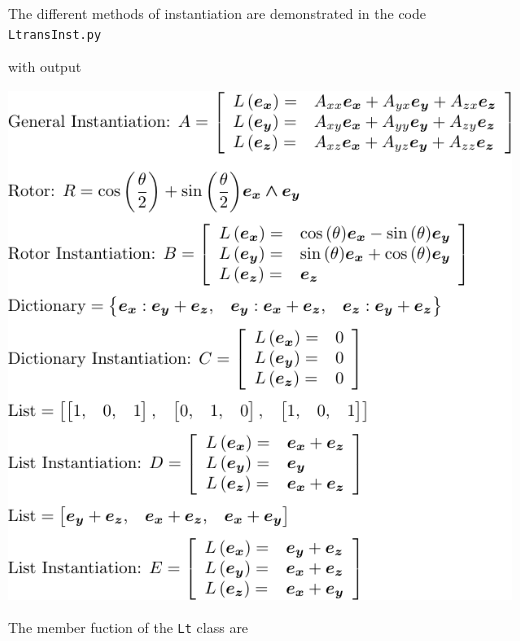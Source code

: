 \documentclass[12pt,twoside,openright]{memoir}
\newcommand{\T}[1]{\texttt{#1}}
\newcommand{\includecode}[1]{}
\begin{document}
The different methods of instantiation are demonstrated in the code \T{LtransInst.py}
\includecode{python/LtransInst.py}
with output
\begin{center}
	\includegraphics[scale=1]{python/LtransInst.pdf}
\end{center}
The member fuction of the \T{Lt} class are
\end{document}
